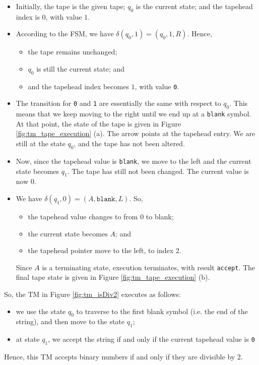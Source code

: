 \begin{itemize}
    \item Initially, the tape is the given tape; $q_0$ is the current state; and the tapehead index is $0$, with value $1$.
    
    \item According to the FSM, we have $\delta(q_0, 1) = (q_0, 1, R)$. Hence,
    \begin{itemize}
        \item the tape remains unchanged;
        \item $q_0$ is still the current state; and
        \item and the tapehead index becomes $1$, with value \texttt{0}.
    \end{itemize}
    
    \item The transition for \texttt{0} and \texttt{1} are essentially the same with respect to $q_0$. This means that we keep moving to the right until we end up at a \texttt{blank} symbol. At that point, the state of the tape is given in Figure \ref{fig:tm_tape_execution} (a). The arrow points at the tapehead entry. We are still at the state $q_0$, and the tape has not been altered.
    
    \item Now, since the tapehead value is \texttt{blank}, we move to the left and the current state becomes $q_1$. The tape has still not been changed. The current value is now $0$.
    
    \item We have $\delta(q_1, 0) = (A, \texttt{blank}, L)$. So, 
    \begin{itemize}
        \item the tapehead value changes to from $0$ to blank;
        \item the current state becomes $A$; and
        \item the tapehead pointer move to the left, to index $2$.
    \end{itemize}
    Since $A$ is a terminating state, execution terminates, with result \texttt{accept}. The final tape state is given in Figure \ref{fig:tm_tape_execution} (b).
    
\end{itemize}
So, the TM in Figure \ref{fig:tm_isDiv2} executes as follows:
\begin{itemize}
    \item we use the state $q_0$ to traverse to the first blank symbol (i.e. the end of the string), and then move to the state $q_1$;
    \item at state $q_1$, we accept the string if and only if the current tapehead value is \texttt{0}
\end{itemize}
Hence, this TM accepts binary numbers if and only if they are divisible by 2.

